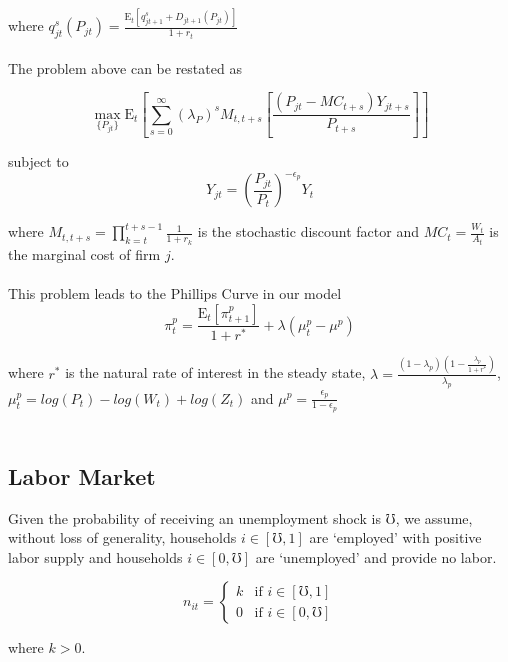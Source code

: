 \documentclass[titlepage]{\econtex}\providecommand{\texname}{BufferStockTheory}
\begin{document}
where  $q^{s}_{jt}\left(P_{jt}\right) = \frac{\mathrm{E}_{t}\left[q^{s}_{jt+1} +D_{jt+1}\left(P_{jt}\right)\right]}{1+r_{t}}$ \\ \\

The problem above can be restated as 
 
 $$\max_{\{P_{jt}\}} \mathrm{E}_{t}\left[\sum_{s=0}^{\infty} (\lambda_{P}) ^{s} M_{t,t+s} \left[ \frac{(P_{jt} - MC_{t+s})Y_{jt+s}}{P_{t+s}}\right]\right]$$
 
subject to $$Y_{jt} = \left(\frac {P_{jt}}{P_{t}}\right)^{- \epsilon_{p}} Y_{t}$$
 
where $M_{t, t+s} = \prod_{k=t}^{t+s-1} \frac{1}{1+r_{k}}$ is the stochastic discount factor and $MC_{t} = \frac{W_{t}}{A_{t}}$ is the marginal cost of firm $j$.  \\ \\


This problem leads to the Phillips Curve in our model \\ 

\begin{equation} \pi_{t}^{p} = \frac{\mathrm{E}_{t}[\pi_{t+1}^{p}]}{1+r^{*}} + \lambda (\mu_{t}^{p} -\mu^{p}) \end{equation}

where $r^{*}$ is the natural rate of interest in the steady state, $\lambda = \frac{(1-\lambda_{p})(1-\frac{\lambda_{p}}{1+r^{*}})}{\lambda_{p}}$,  $ \mu_{t}^{p} = log(P_{t}) - log(W_{t}) + log(Z_{t})$ and $\mu^{p} = \frac{\epsilon_{p}}{1-\epsilon_{p}}$ \\ \\



\hypertarget{Labor Market}{}
\subsection{Labor Market}

Given the probability of receiving an unemployment shock is $\mho$, we assume, without loss of generality, households $i \in [\mho,1]$ are `employed'  with positive labor supply and households $i \in [0, \mho]$  are `unemployed' and provide no labor. 

$$
n _{it}=
\begin{cases}
 k  & \text{if  $i \in [\mho, 1]$} \\
 0      & \text{if  $i \in [0, \mho]$} 
\end{cases} 
$$

where $k>0$. \\
\end{document}
